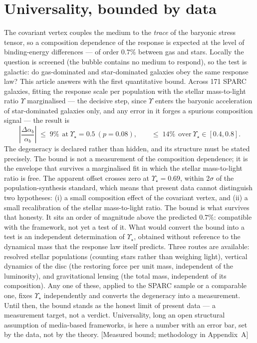 \section{Universality, bounded by data}
The covariant vertex couples the medium to the \emph{trace} of the baryonic stress tensor, so a composition dependence of the response is expected at the level of binding-energy differences --- of order $0.7\%$ between gas and stars. Locally the question is screened (the bubble contains no medium to respond), so the test is galactic: do gas-dominated and star-dominated galaxies obey the same response law? This article answers with the first quantitative bound. Across 171 SPARC galaxies, fitting the response scale per population with the stellar mass-to-light ratio $\Upsilon$ marginalised --- the decisive step, since $\Upsilon$ enters the baryonic acceleration of star-dominated galaxies only, and any error in it forges a spurious composition signal --- the result is
\begin{equation}
\left|\frac{\Delta\alpha_{b}}{\alpha_{b}}\right|\;\leq\;9\%\ \ \text{at}\ \Upsilon_{\star}=0.5\ (p=0.08),\qquad \leq\;14\%\ \ \text{over}\ \Upsilon_{\star}\in[0.4,0.8].
\end{equation}
The degeneracy is declared rather than hidden, and its structure must be stated precisely. The bound is not a measurement of the composition dependence; it is the envelope that survives a marginalised fit in which the stellar mass-to-light ratio is free. The apparent offset crosses zero at $\Upsilon_{\star}=0.69$, within $2\sigma$ of the population-synthesis standard, which means that present data cannot distinguish two hypotheses: (i) a small composition effect of the covariant vertex, and (ii) a small recalibration of the stellar mass-to-light ratio. The bound is what survives that honesty. It sits an order of magnitude above the predicted $0.7\%$: compatible with the framework, not yet a test of it. What would convert the bound into a test is an independent determination of $\Upsilon_{\star}$, obtained without reference to the dynamical mass that the response law itself predicts. Three routes are available: resolved stellar populations (counting stars rather than weighing light), vertical dynamics of the disc (the restoring force per unit mass, independent of the luminosity), and gravitational lensing (the total mass, independent of its composition). Any one of these, applied to the SPARC sample or a comparable one, fixes $\Upsilon_{\star}$ independently and converts the degeneracy into a measurement. Until then, the bound stands as the honest limit of present data --- a measurement target, not a verdict. Universality, long an open structural assumption of media-based frameworks, is here a number with an error bar, set by the data, not by the theory. [Measured bound; methodology in Appendix~A]

